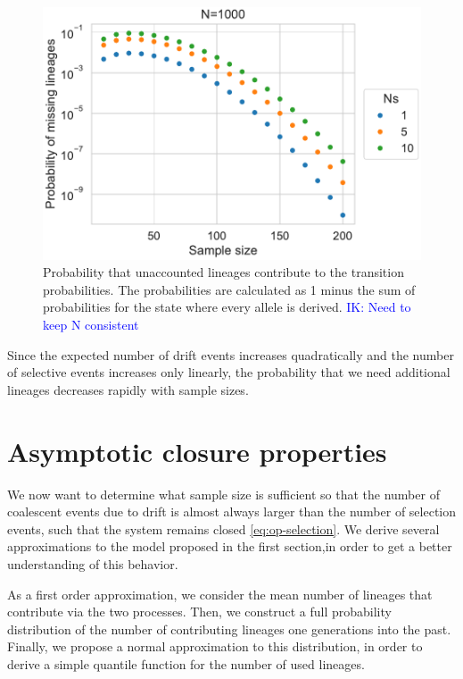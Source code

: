 \documentclass[review]{elsarticle}
\newcommand{\ikcomment}[1]{\textcolor{blue}{IK: #1}}
\begin{document}
\begin{figure}
  \centering
  \includegraphics[]{fig/missing.pdf}
  \caption{Probability that unaccounted lineages contribute to the transition probabilities. The
    probabilities are calculated as 1 minus the sum of probabilities for the state where every
    allele is derived. \ikcomment{Need to keep N consistent}}
    \label{fig:missing}
\end{figure}

Since the expected number of drift events increases quadratically and the number of selective events increases only linearly, the probability that we need additional lineages decreases rapidly with sample sizes. 

\section{Asymptotic closure properties}

We now want to determine what sample size is sufficient so that the number of coalescent events due
to drift is almost always larger than the number of selection events, such that the system remains closed
\eqref{eq:op-selection}. We derive several approximations to the model proposed in the first
section,in order to get a better understanding of this behavior.

As a first order approximation, we consider the mean number of lineages that contribute via the two
processes. Then, we construct a full probability distribution of the number of contributing lineages
one generations into the past. Finally, we propose a normal approximation to this distribution, in
order to derive a simple quantile function for the number of used lineages.
\end{document}
